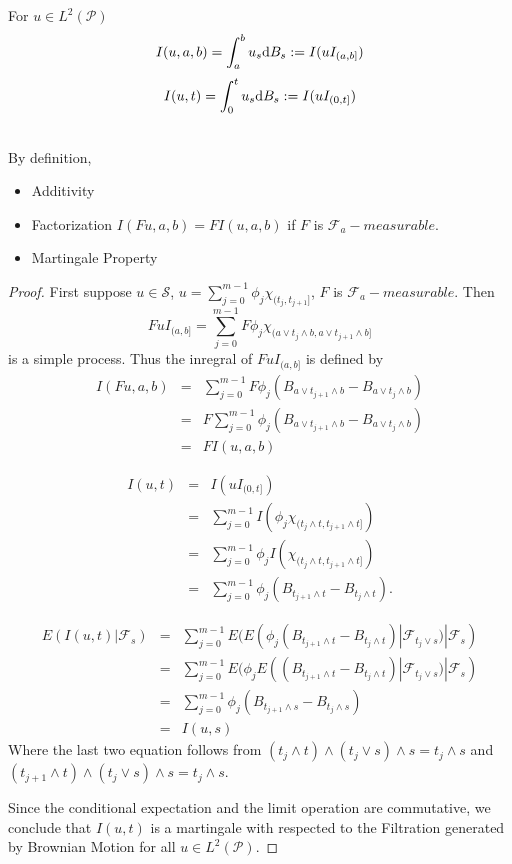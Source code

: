 \documentclass[12pt]{book}
\begin{document}
\begin{definition}
For $u \in L^2(\mathcal P)$
$$
I(u,a,b) = \int_a^b u_s \mathrm{d} B_s := I(uI_{(a,b]})
$$
$$
I(u,t) = \int_0^t u_s \mathrm{d} B_s := I(uI_{(0,t]})
$$

\end{definition}
\begin{theorem}\label{Indef_prop} \ \\
By definition, 
\begin{itemize}
	\item Additivity
	\item Factorization $I(Fu,a,b)=FI(u,a,b)$ if $F$ is $\mathcal{F}_a-measurable$.
	\item Martingale Property
\end{itemize}
\begin{proof}
First suppose $u \in \mathcal{S}$, $u = \sum_{j=0}^{m-1}\phi_j \chi_{(t_j,t_{j+1}]}$, $F$ is $\mathcal{F}_a-measurable$. Then 
$$
FuI_{(a,b]} = \sum_{j=0}^{m-1}F\phi_j \chi_{(a\vee t_j \wedge b, a \vee t_{j+1} \wedge b]}
$$
is a simple process. Thus the inregral of $FuI_{(a,b]}$ is defined by
\begin{eqnarray*}
	I(Fu,a,b) &=& \sum_{j=0}^{m-1}F\phi_j(B_{a\vee t_{j+1} \wedge b}-B_{a\vee t_j \wedge b}) \\
	&=& F\sum_{j=0}^{m-1}\phi_j(B_{a\vee t_{j+1} \wedge b}-B_{a\vee t_j \wedge b}) \\
	&=& FI(u,a,b) 
\end{eqnarray*}

\begin{eqnarray*}
	I(u,t) &=& I(uI_{(0,t]}) \\
	&=&  \sum_{j=0}^{m-1}I(\phi_j \chi_{(t_j \wedge t,t_{j+1} \wedge t]}) \\
	&=& \sum_{j=0}^{m-1}\phi_jI(\chi_{(t_j \wedge t,t_{j+1} \wedge t]}) \\
	&=& \sum_{j=0}^{m-1}\phi_j(B_{t_{j+1} \wedge t}-B_{t_j \wedge t}).
\end{eqnarray*}

\begin{eqnarray*}
	E(I(u,t)|\mathcal{F}_s) &=& \sum_{j=0}^{m-1} E(E(\phi_j(B_{t_{j+1} \wedge t}-B_{t_j \wedge t})|\mathcal{F}_{t_j \vee s})|\mathcal{F}_s) \\
	&=& \sum_{j=0}^{m-1} E(\phi_jE((B_{t_{j+1} \wedge t}-B_{t_j \wedge t})|\mathcal{F}_{t_j \vee s})|\mathcal{F}_s) \\
	&=& \sum_{j=0}^{m-1}\phi_j(B_{t_{j+1}\wedge s}-B_{t_{j}\wedge s}) \\
	&=& I(u,s)
\end{eqnarray*}
Where the last two equation follows from $(t_j \wedge t)\wedge (t_j \vee s) \wedge s=t_j \wedge s$ and $(t_{j+1} \wedge t)\wedge (t_j \vee s) \wedge s=t_j \wedge s$.

Since the conditional expectation and the limit operation are commutative, we conclude that $I(u,t)$ is a martingale with respected to the Filtration generated by Brownian Motion for all $u \in L^2(\mathcal P)$.
\end{proof}
\end{theorem}
\end{document}
